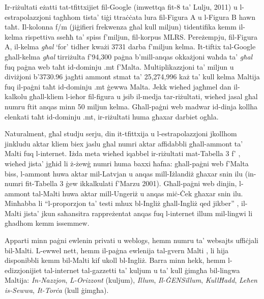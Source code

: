 \begin{multicols}{2}
Ir-riżultati eżatti tat-tfittxijiet fil-Google (imwettqa fit-8 ta’ Lulju, 2011) u l-estrapolazzjoni tagħhom tista’ tiġi ttraċċata lura fil-Figura A u l-Figura B hawn taħt. Il-kolonna f/m (jiġifieri frekwenza għal kull miljun) tidentifika kemm il-kelma rispettiva sseħħ ta’ spiss f’miljun, fil-korpus MLRS. Pereżempju, fil-Figura A, il-kelma \emph{għal} ‘for’ tidher kważi 3731 darba f’miljun kelma. It-tiftix tal-Google għall-kelma \emph{għal} tirriżulta f’94,300 paġna b’mill-anqas okkażjoni waħda ta’ \emph{għal} fuq paġna web taħt id-dominju .mt f'Malta. Multiplikazzjoni ta’ miljun u diviżjoni b’3730.96 jagħti ammont stmat ta’ 25,274,996 każ ta’ kull kelma Maltija fuq il-paġni taħt id-dominju .mt ġewwa Malta. Jekk wieħed jagħmel dan il-kalkolu għall-kliem l-ieħor fil-figura u jsib il-medja tar-riżultati, wieħed jasal għal numru ftit anqas minn 50 miljun kelma. Għall-paġni web madwar id-dinja kollha elenkati taħt id-dominju .mt, ir-riżultati huma għaxar darbiet ogħla.

Naturalment, għal studju serju, din it-tfittxija u l-estrapolazzjoni jkollhom jinkludu aktar kliem biex jaslu għal numri aktar affidabbli għall-ammont ta’ Malti fuq l-internet. Iżda meta wieħed iqabbel ir-riżultati mat-Tabella 3 f’ \cite{Kilgarriff-Grefenstette:2003}, wieħed jista’ jgħid li ż-żewġ numri huma baxxi ħafna: għall-paġni web f’Malta biss, l-ammont huwa aktar mil-Latvjan u anqas mill-Iżlandiż għaxar snin ilu (in-numri fit-Tabella 3 ġew ikkalkulati f’Marzu 2001). Għall-paġni web dinjin, l-ammont tal-Malti huwa aktar mill-Ungeriż u anqas miċ-Ċek għaxar snin ilu. Minħabba li ``l-proporzjon ta’ testi mhux bl-Ingliż għall-Ingliż qed jikber'' \cite{Kilgarriff-Grefenstette:2003}, il-Malti jista’ jkun saħansitra rappreżentat anqas fuq l-internet illum mil-lingwi li għadhom kemm issemmew.

Apparti minn paġni ewlenin privati u weblogs, hemm numru ta’ websajts uffiċjali bil-Malti. L-ewwel nett, hemm il-paġna ewlenija tal-gvern Malti \cite{GovernmentOfMalta1}, li hija disponibbli kemm bil-Malti kif ukoll bl-Ingliż. Barra minn hekk, hemm l-edizzjonijiet tal-internet tal-gazzetti ta’ kuljum u ta’ kull ġimgħa bil-lingwa Maltija: \emph{In-Nazzjon}, \emph{L-Orizzont} (kuljum), \emph{Illum}, \emph{Il-ĠENSillum}, \emph{KullĦadd}, \emph{Leħen is-Sewwa}, \emph{It-Torċa} (kull ġimgħa).


\end{multicols}
